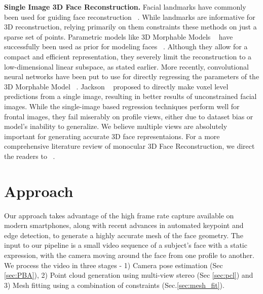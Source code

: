 \documentclass[10pt,twocolumn,letterpaper]{article}
\begin{document}
\noindent \textbf{Single Image 3D Face Reconstruction.} Facial landmarks have commonly been used for guiding face reconstruction ~\cite{zhu2015high, aldrian2010linear, kemelmacher20113d, dou2014robust}. While landmarks are informative for 3D reconstruction, relying primarily on them constraints these methods on just a sparse set of points. Parametric models like 3D Morphable Models ~\cite{blanz1999morphable} have successfully been used as prior for modeling faces ~\cite{blanz1999morphable, breuer2008automatic, zhu2015high, saito2017photorealistic, jiang20183d, richardson20163d, tuan2017regressing}. Although they allow for a compact and efficient representation, they severely limit the reconstruction to a low-dimensional linear subspace, as stated earlier. More recently, convolutional neural networks have been put to use for directly regressing the parameters of the 3D Morphable Model ~\cite{zhu2016face, jourabloo2016large, huber2016multiresolution}. Jackson \etal ~\cite{jackson2017large} proposed to directly make voxel level predictions from a single image, resulting in better results of unconstrained facial images. While the single-image based regression techniques perform well for frontal images, they fail miserably on profile views, either due to dataset bias or model's inability to generalize. We believe multiple views are absolutely important for generating accurate 3D face representaions.  For a more comprehensive literature review of monocular 3D Face Reconstruction, we direct the readers to ~\cite{zollhofer2018state}.




\section{Approach}

Our approach takes advantage of the high frame rate capture available on modern smartphones, along with recent advances in automated keypoint and edge detection, to generate a highly accurate mesh of the face geometry. 
The input to our pipeline is a small video sequence of a subject's face with a static expression, with the camera moving around the face from one profile to another.
We process the video in three stages -  1) Camera pose estimation (Sec \ref{sec:PBA}), 2) Point cloud generation using multi-view stereo (Sec \ref{sec:pcl}) and 3) Mesh fitting using a combination of constraints (Sec.\ref{sec:mesh_fit}). 
\end{document}
